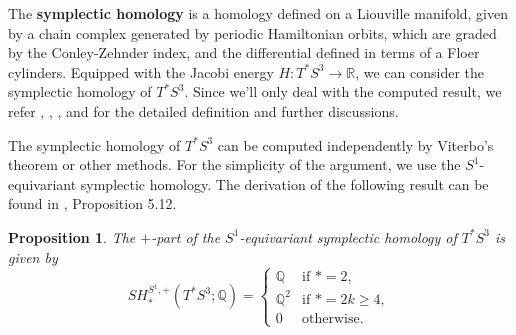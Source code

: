 \documentclass{amsart}
\newcommand{\Q}{\mathbb{Q}}
\newcommand{\R}{\mathbb{R}}
\newtheorem{prop}[thm]{Proposition}
\begin{document}
The \textbf{symplectic homology} is a homology defined on a Liouville manifold, given by a chain complex generated by periodic Hamiltonian orbits, which are graded by the Conley-Zehnder index, and the differential defined in terms of a Floer cylinders.
Equipped with the Jacobi energy $H:T^*S^3\to \R$, we can consider the symplectic homology of $T^*S^3$.
Since we'll only deal with the computed result, we refer \cite{Audin_Damien_14}, \cite{Abouzaid_15}, \cite{Kwon_van_Koert_16}, and \cite{Gutt_18} for the detailed definition and further discussions.

The symplectic homology of $T^*S^3$ can be computed independently by Viterbo's theorem or other methods.
For the simplicity of the argument, we use the $S^1$-equivariant symplectic homology.
The derivation of the following result can be found in \cite{Kwon_van_Koert_16}, Proposition 5.12.

\begin{prop}\label{Proposition - S1 equivariant homology of TS3}
	The $+$-part of the $S^1$-equivariant symplectic homology of $T^*S^3$ is given by
	$$
	SH^{S^1,+}_* (T^*S^3;\Q) = \left\{\begin{array}{cc}
		\Q&\text{if}\,\,*=2,\\
		\Q^2&\text{if}\,\,*=2k\geq4,\\
		0&\text{otherwise}.
	\end{array}\right.
	$$
\end{prop}
\end{document}
